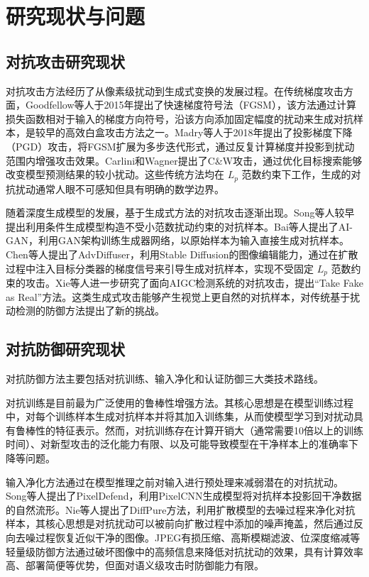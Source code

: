 \documentclass[type=bachelor,oneside]{fduthesis}
\begin{document}
\section{研究现状与问题}

\subsection{对抗攻击研究现状}

对抗攻击方法经历了从像素级扰动到生成式变换的发展过程。在传统梯度攻击方面，Goodfellow等人\cite{goodfellow2015explaining}于2015年提出了快速梯度符号法（FGSM），该方法通过计算损失函数相对于输入的梯度方向符号，沿该方向添加固定幅度的扰动来生成对抗样本，是较早的高效白盒攻击方法之一。Madry等人\cite{madry2018towards}于2018年提出了投影梯度下降（PGD）攻击，将FGSM扩展为多步迭代形式，通过反复计算梯度并投影到扰动范围内增强攻击效果。Carlini和Wagner\cite{carlini2017towards}提出了C\&W攻击，通过优化目标搜索能够改变模型预测结果的较小扰动。这些传统方法均在 $L_p$ 范数约束下工作，生成的对抗扰动通常人眼不可感知但具有明确的数学边界。

随着深度生成模型的发展，基于生成式方法的对抗攻击逐渐出现。Song等人\cite{song2018constructing}较早提出利用条件生成模型构造不受小范数扰动约束的对抗样本。Bai等人\cite{bai2021aigan}提出了AI-GAN，利用GAN架构训练生成器网络，以原始样本为输入直接生成对抗样本。Chen等人\cite{chen2023advdiffuser}提出了AdvDiffuser，利用Stable Diffusion\cite{rombach2022highresolution}的图像编辑能力，通过在扩散过程中注入目标分类器的梯度信号来引导生成对抗样本，实现不受固定 $L_p$ 范数约束的攻击。Xie等人\cite{xie2025takefake}进一步研究了面向AIGC检测系统的对抗攻击，提出“Take Fake as Real”方法。这类生成式攻击能够产生视觉上更自然的对抗样本，对传统基于扰动检测的防御方法提出了新的挑战。

\subsection{对抗防御研究现状}

对抗防御方法主要包括对抗训练、输入净化和认证防御三大类技术路线。

对抗训练\cite{madry2018towards,tramer2020ensemble}是目前最为广泛使用的鲁棒性增强方法。其核心思想是在模型训练过程中，对每个训练样本生成对抗样本并将其加入训练集，从而使模型学习到对扰动具有鲁棒性的特征表示。然而，对抗训练存在计算开销大（通常需要10倍以上的训练时间）、对新型攻击的泛化能力有限、以及可能导致模型在干净样本上的准确率下降等问题。

输入净化方法通过在模型推理之前对输入进行预处理来减弱潜在的对抗扰动。Song等人\cite{song2018pixeldefend}提出了PixelDefend，利用PixelCNN生成模型将对抗样本投影回干净数据的自然流形。Nie等人\cite{nie2022diffpure}提出了DiffPure方法，利用扩散模型的去噪过程来净化对抗样本，其核心思想是对抗扰动可以被前向扩散过程中添加的噪声掩盖，然后通过反向去噪过程恢复近似干净的图像。JPEG有损压缩、高斯模糊滤波、位深度缩减等轻量级防御方法通过破坏图像中的高频信息来降低对抗扰动的效果，具有计算效率高、部署简便等优势，但面对语义级攻击时防御能力有限。
\end{document}
